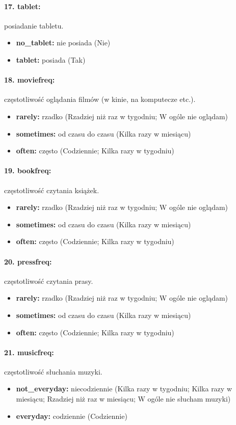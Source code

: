 \documentclass[10pt, a4paper]{article}
\begin{document}
\paragraph{17. tablet:} posiadanie tabletu.
\begin{itemize}
	\item {\bf no\_tablet:} nie posiada (Nie)
	\item {\bf tablet:} posiada (Tak)
\end{itemize}
\paragraph{18. moviefreq:} częstotliwość oglądania filmów (w kinie, na komputecze etc.).
\begin{itemize}
	\item {\bf rarely:} rzadko (Rzadziej niż raz w tygodniu; W ogóle nie oglądam) 
	\item {\bf sometimes:} od czasu do czasu (Kilka razy w miesiącu)
	\item {\bf often:} często (Codziennie; Kilka razy w tygodniu)
\end{itemize}
\paragraph{19. bookfreq:} częstotliwość czytania książek.
\begin{itemize}
	\item {\bf rarely:} rzadko (Rzadziej niż raz w tygodniu; W ogóle nie oglądam)
	\item {\bf sometimes:} od czasu do czasu (Kilka razy w miesiącu)
	\item {\bf often:} często (Codziennie; Kilka razy w tygodniu)
\end{itemize}
\paragraph{20. pressfreq:} częstotliwość czytania prasy.
\begin{itemize}
	\item {\bf rarely:} rzadko (Rzadziej niż raz w tygodniu; W ogóle nie oglądam)
	\item {\bf sometimes:} od czasu do czasu (Kilka razy w miesiącu)
	\item {\bf often:} często (Codziennie; Kilka razy w tygodniu)
\end{itemize}
\paragraph{21. musicfreq:} częstotliwość słuchania muzyki.
\begin{itemize}
	\item {\bf not\_everyday:} niecodziennie (Kilka razy w tygodniu; Kilka razy w miesiącu; Rzadziej niż raz w miesiącu; W ogóle nie słucham muzyki)
	\item {\bf everyday:} codziennie (Codziennie)
\end{itemize}
\end{document}
